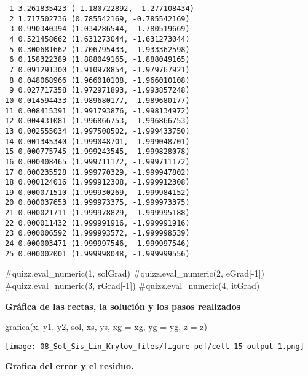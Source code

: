 \documentclass[
  letterpaper,
  DIV=11,
  numbers=noendperiod]{scrreprt}
\newenvironment{Shaded}{\begin{snugshade}}{\end{snugshade}}
\newcommand{\CommentTok}[1]{\textcolor[rgb]{0.37,0.37,0.37}{#1}}
\newcommand{\NormalTok}[1]{\textcolor[rgb]{0.00,0.23,0.31}{#1}}
\newcommand{\OperatorTok}[1]{\textcolor[rgb]{0.37,0.37,0.37}{#1}}
\begin{document}
\begin{verbatim}
 1 3.261835423 (-1.180722892, -1.277108434)
 2 1.717502736 (0.785542169, -0.785542169)
 3 0.990340394 (1.034286544, -1.780519669)
 4 0.521458662 (1.631273044, -1.631273044)
 5 0.300681662 (1.706795433, -1.933362598)
 6 0.158322389 (1.888049165, -1.888049165)
 7 0.091291300 (1.910978854, -1.979767921)
 8 0.048068966 (1.966010108, -1.966010108)
 9 0.027717358 (1.972971893, -1.993857248)
10 0.014594433 (1.989680177, -1.989680177)
11 0.008415391 (1.991793876, -1.998134972)
12 0.004431081 (1.996866753, -1.996866753)
13 0.002555034 (1.997508502, -1.999433750)
14 0.001345340 (1.999048701, -1.999048701)
15 0.000775745 (1.999243545, -1.999828078)
16 0.000408465 (1.999711172, -1.999711172)
17 0.000235528 (1.999770329, -1.999947802)
18 0.000124016 (1.999912308, -1.999912308)
19 0.000071510 (1.999930269, -1.999984152)
20 0.000037653 (1.999973375, -1.999973375)
21 0.000021711 (1.999978829, -1.999995188)
22 0.000011432 (1.999991916, -1.999991916)
23 0.000006592 (1.999993572, -1.999998539)
24 0.000003471 (1.999997546, -1.999997546)
25 0.000002001 (1.999998048, -1.999999556)
\end{verbatim}

\begin{Shaded}
\begin{Highlighting}[]
\CommentTok{\#quizz.eval\_numeric(\textquotesingle{}1\textquotesingle{}, solGrad)}
\CommentTok{\#quizz.eval\_numeric(\textquotesingle{}2\textquotesingle{}, eGrad[{-}1])}
\CommentTok{\#quizz.eval\_numeric(\textquotesingle{}3\textquotesingle{}, rGrad[{-}1])}
\CommentTok{\#quizz.eval\_numeric(\textquotesingle{}4\textquotesingle{}, itGrad)}
\end{Highlighting}
\end{Shaded}

\textbf{Gráfica de las rectas, la solución y los pasos realizados}

\begin{Shaded}
\begin{Highlighting}[]
\NormalTok{grafica(x, y1, y2, sol, xs, ys, xg }\OperatorTok{=}\NormalTok{ xg, yg }\OperatorTok{=}\NormalTok{ yg, z }\OperatorTok{=}\NormalTok{ z)}
\end{Highlighting}
\end{Shaded}

\texttt{[image: 08\_Sol\_Sis\_Lin\_Krylov\_files/figure-pdf/cell-15-output-1.png]}

\textbf{Grafica del error y el residuo.}
\end{document}
